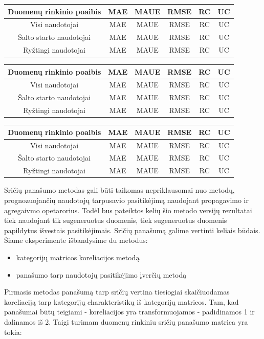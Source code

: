 \documentclass{VUMIFInfMagistrinis}
\begin{document}
\begin{center}
	\begin{tabular}{||c c c c c c||} 
		Duomenų rinkinio poaibis & MAE & MAUE & RMSE & RC & UC \\
		\hline
		Visi naudotojai & MAE & MAUE & RMSE & RC & UC \\
		\hline
		Šalto starto naudotojai & MAE & MAUE & RMSE & RC & UC \\
		\hline
		Ryžtingi naudotojai & MAE & MAUE & RMSE & RC & UC \\
	\end{tabular}
\end{center}
\begin{center}
	\begin{tabular}{||c c c c c c||} 
		Duomenų rinkinio poaibis & MAE & MAUE & RMSE & RC & UC \\
		\hline
		Visi naudotojai & MAE & MAUE & RMSE & RC & UC \\
		\hline
		Šalto starto naudotojai & MAE & MAUE & RMSE & RC & UC \\
		\hline
		Ryžtingi naudotojai & MAE & MAUE & RMSE & RC & UC \\
	\end{tabular}
	
\end{center}
\begin{center}
	\begin{tabular}{||c c c c c c||} 
		Duomenų rinkinio poaibis & MAE & MAUE & RMSE & RC & UC \\
		\hline
		Visi naudotojai & MAE & MAUE & RMSE & RC & UC \\
		\hline
		Šalto starto naudotojai & MAE & MAUE & RMSE & RC & UC \\
		\hline
		Ryžtingi naudotojai & MAE & MAUE & RMSE & RC & UC \\
	\end{tabular}
\end{center}
\indent
Sričių panašumo metodas gali būti taikomas nepriklausomai nuo metodų, prognozuojančių naudotojų tarpusavio pasitikėjimą naudojant propagavimo ir agregaivmo opetarorius. Todėl bus pateiktos kelių šio metodo versijų rezultatai tiek naudojant tik sugeneruotus duomenis, tiek sugeneruotus duomenis papildytus išvestais pasitikėjimais.
\newline
\indent
Sričių panašumą galime vertinti keliais būdais. Šiame eksperimente išbandysime du metodus:
\begin{itemize}
	\item kategorijų matricos koreliacijos metodą
	\item panašumo tarp naudotojų pasitikėjimo įverčių metodą
\end{itemize}
Pirmasis metodas panašumą tarp sričių vertina tiesiogiai skaičiuodamas koreliaciją tarp kategorijų charakteristikų iš kategorijų matricos. Tam, kad panašumai būtų teigiami - koreliacijos yra transformuojamos - padidinamos 1 ir dalinamos iš 2. Taigi turimam duomenų rinkiniu sričių panašumo matrica yra tokia:
\end{document}
